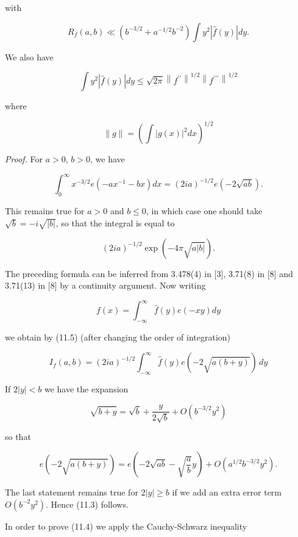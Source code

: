 \documentclass[10pt]{article}
\begin{document}
with


\begin{equation*}
R_{f}(a, b) \ll\left(b^{-3 / 2}+a^{-1 / 2} b^{-2}\right) \int y^{2}|\hat{f}(y)| d y . \tag{11.3}
\end{equation*}


We also have


\begin{equation*}
\int y^{2}|\hat{f}(y)| d y \leqslant \sqrt{2 \pi}\left\|f^{\prime \prime}\right\|^{1 / 2}\left\|f^{\prime \prime \prime}\right\|^{1 / 2} \tag{11.4}
\end{equation*}


where

$$
\|g\|=\left(\int|g(x)|^{2} d x\right)^{1 / 2}
$$

\medskip\noindent\textit{Proof.} For $a>0$, $b>0$, we have


\begin{equation*}
\int_{0}^{\infty} x^{-3 / 2} e\left(-a x^{-1}-b x\right) d x=(2 i a)^{-1 / 2} e(-2 \sqrt{a b}) . \tag{11.5}
\end{equation*}


This remains true for $a>0$ and $b \leqslant 0$, in which case one should take $\sqrt{b}=-i\sqrt{|b|}$, so that the integral is equal to

$$
(2 i a)^{-1 / 2} \exp (-4 \pi \sqrt{a|b|}) .
$$

The preceding formula can be inferred from 3.478(4) in [3], 3.71(8) in [8] and 3.71(13) in [8] by a continuity argument. Now writing

$$
f(x)=\int_{-\infty}^{\infty} \hat{f}(y) e(-x y) d y
$$

we obtain by (11.5) (after changing the order of integration)

$$
I_{f}(a, b)=(2 i a)^{-1 / 2} \int_{-\infty}^{\infty}\widehat f(y)e(-2\sqrt{a(b+y)})\,dy
$$

If $2|y|<b$ we have the expansion

$$
\sqrt{b+y}=\sqrt{b}+\frac{y}{2 \sqrt{b}}+O\left(b^{-3 / 2} y^{2}\right)
$$

so that

$$
e(-2 \sqrt{a(b+y)})=e\left(-2 \sqrt{a b}-\sqrt{\frac{a}{b}} y\right)+O\left(a^{1 / 2} b^{-3 / 2} y^{2}\right) .
$$

The last statement remains true for $2|y| \geqslant b$ if we add an extra error term $O\left(b^{-2} y^{2}\right)$. Hence (11.3) follows.

In order to prove (11.4) we apply the Cauchy-Schwarz inequality
\end{document}
